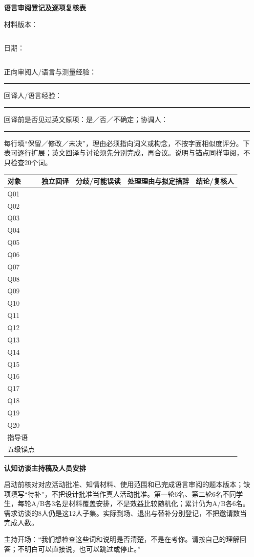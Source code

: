\documentclass[11pt,a4paper]{article}
\newcommand{\reviewsubsection}[1]{\par\Needspace{4\baselineskip}\begin{center}{\titlelatin\titlecjk\bfseries\fontsize{12}{18}\selectfont #1}\end{center}}
\begin{document}
\reviewsubsection{11.2 语言审阅登记及逐项复核表}
材料版本：\rule{62mm}{0.4pt}\quad 日期：\rule{30mm}{0.4pt}

正向审阅人/语言与测量经验：\rule{88mm}{0.4pt}

回译人/语言经验：\rule{104mm}{0.4pt}

回译前是否见过英文原项：是／否／不确定；协调人：\rule{40mm}{0.4pt}

每行填“保留／修改／未决”，理由必须指向词义或构念，不按字面相似度评分。下表可逐行扩展；英文回译与讨论须先分别完成，再合议。说明与锚点同样审阅，不只检查20个词。
\begin{longtable}{L{16mm}L{29mm}L{29mm}L{42mm}L{26mm}}
对象 & 独立回译 & 分歧/可能误读 & 处理理由与拟定措辞 & 结论/复核人\\\hline
Q01 & & & & \\[5mm]
Q02 & & & & \\[5mm]
Q03 & & & & \\[5mm]
Q04 & & & & \\[5mm]
Q05 & & & & \\[5mm]
Q06 & & & & \\[5mm]
Q07 & & & & \\[5mm]
Q08 & & & & \\[5mm]
Q09 & & & & \\[5mm]
Q10 & & & & \\[5mm]
Q11 & & & & \\[5mm]
Q12 & & & & \\[5mm]
Q13 & & & & \\[5mm]
Q14 & & & & \\[5mm]
Q15 & & & & \\[5mm]
Q16 & & & & \\[5mm]
Q17 & & & & \\[5mm]
Q18 & & & & \\[5mm]
Q19 & & & & \\[5mm]
Q20 & & & & \\[5mm]
指导语 & & & & \\[5mm]
五级锚点 & & & & \\[5mm]
\end{longtable}
\reviewsubsection{11.3 认知访谈主持稿及人员安排}
启动前核对对应活动批准、知情材料、使用范围和已完成语言审阅的题本版本；缺项填写“待补”，不把设计批准当作真人活动批准。第一轮6名、第二轮6名不同学生，每轮A/B各3名是材料覆盖安排，不是效益比较随机化；累计仍为A/B各6名。需求访谈的8人仍是这12人子集。实际到场、退出与替补分别登记，不把邀请数当完成人数。

主持开场：“我们想检查这些词和说明是否清楚，不是在考你。请按自己的理解回答；不明白可以直接说，也可以跳过或停止。”
\end{document}
